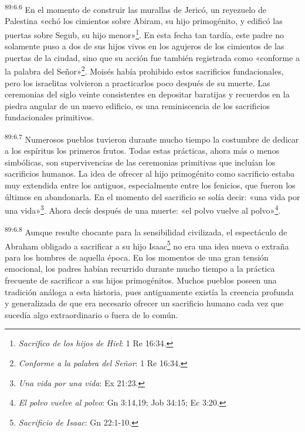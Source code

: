 \par
\textsuperscript{89:6.6} En el momento de construir las murallas de Jericó, un reyezuelo de Palestina «echó los cimientos sobre Abiram, su hijo primogénito, y edificó las puertas sobre Segub, su hijo menor»\footnote{\textit{Sacrifico de los hijos de Hiel}: 1 Re 16:34.}. En esta fecha tan tardía, este padre no solamente puso a dos de sus hijos vivos en los agujeros de los cimientos de las puertas de la ciudad, sino que su acción fue también registrada como «conforme a la palabra del Señor»\footnote{\textit{Conforme a la palabra del Señor}: 1 Re 16:34.}. Moisés había prohibido estos sacrificios fundacionales, pero los israelitas volvieron a practicarlos poco después de su muerte. Las ceremonias del siglo veinte consistentes en depositar baratijas y recuerdos en la piedra angular de un nuevo edificio, es una reminiscencia de los sacrificios fundacionales primitivos.

\par
\textsuperscript{89:6.7} Numerosos pueblos tuvieron durante mucho tiempo la costumbre de dedicar a los espíritus los primeros frutos. Todas estas prácticas, ahora más o menos simbólicas, son supervivencias de las ceremonias primitivas que incluían los sacrificios humanos. La idea de ofrecer al hijo primogénito como sacrificio estaba muy extendida entre los antiguos, especialmente entre los fenicios, que fueron los últimos en abandonarla. En el momento del sacrificio se solía decir: «una vida por una vida»\footnote{\textit{Una vida por una vida}: Ex 21:23.}. Ahora decís después de una muerte: «el polvo vuelve al polvo»\footnote{\textit{El polvo vuelve al polvo}: Gn 3:14,19; Job 34:15; Ec 3:20.}.

\par
\textsuperscript{89:6.8} Aunque resulte chocante para la sensibilidad civilizada, el espectáculo de Abraham obligado a sacrificar a su hijo Isaac\footnote{\textit{Sacrificio de Isaac}: Gn 22:1-10.} no era una idea nueva o extraña para los hombres de aquella época. En los momentos de una gran tensión emocional, los padres habían recurrido durante mucho tiempo a la práctica frecuente de sacrificar a sus hijos primogénitos. Muchos pueblos poseen una tradición análoga a esta historia, pues antiguamente existía la creencia profunda y generalizada de que era necesario ofrecer un sacrificio humano cada vez que sucedía algo extraordinario o fuera de lo común.

